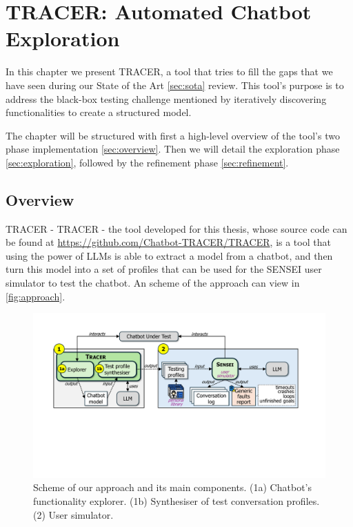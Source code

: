 
\chapter{TRACER: Automated Chatbot Exploration}\label{chapter:tracer}

In this chapter we present \ac{TRACER},
a tool that tries to fill the gaps that we have seen
during our State of the Art \autoref{sec:sota} review.
This tool's purpose is to address the black-box testing challenge mentioned
by iteratively discovering functionalities
to create a structured model.

The chapter will be structured with first
a high-level overview of the tool's two phase implementation \autoref{sec:overview}.
Then we will detail the exploration phase \autoref{sec:exploration},
followed by the refinement phase \autoref{sec:refinement}.

\section{Overview}\label{sec:overview}

\ac{TRACER} - \acl{TRACER} - the tool developed for this thesis,
whose source code can be found at \url{https://github.com/Chatbot-TRACER/TRACER},
is a tool that using the power of \acp{LLM}
is able to extract a model from a chatbot,
and then turn this model into a set of profiles
that can be used for the SENSEI user simulator
to test the chatbot.
An scheme of the approach can view in \autoref{fig:approach}.

\begin{figure}[htpb]
  \centering
  \includegraphics[width=\linewidth]{figures/approach.pdf}
  \caption{Scheme of our approach and its main components.
    (1a) Chatbot’s functionality explorer.
    (1b) Synthesiser of test conversation profiles.
    (2) User simulator.}
  \label{fig:approach}
\end{figure}

